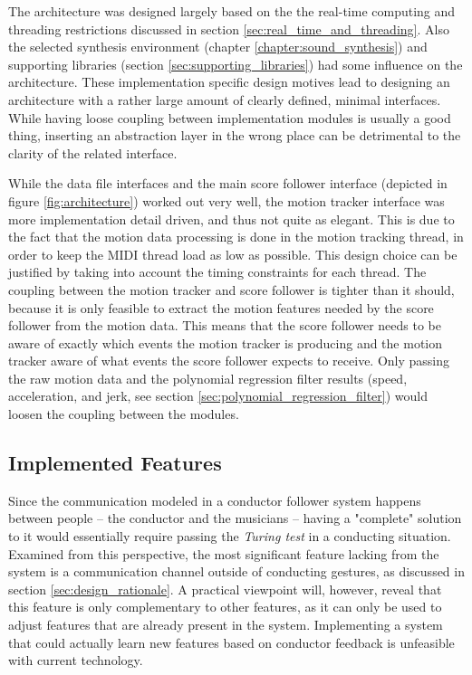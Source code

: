 The architecture was designed largely
based on the the
real-time computing and threading
restrictions discussed
in section \ref{sec:real_time_and_threading}.
Also the selected synthesis environment
(chapter \ref{chapter:sound_synthesis})
and supporting libraries
(section \ref{sec:supporting_libraries})
had some influence on the architecture.
These implementation specific
design motives lead to designing an architecture
with a rather large amount of clearly defined,
minimal interfaces.
While having loose coupling between
implementation modules is
usually a good thing,
inserting an abstraction layer
in the wrong place can be detrimental
to the clarity of the related interface.

While the data file interfaces
and the main score follower interface
(depicted in figure \ref{fig:architecture})
worked out very well,
the motion tracker interface
was more implementation detail driven,
and thus not quite as elegant.
This is due to the fact that the
motion data processing is done
in the motion tracking thread,
in order to keep the MIDI thread load
as low as possible.
This design choice can be justified
by taking into account the
timing constraints for each thread.
The coupling between the motion tracker
and score follower is tighter than it should,
because it is only feasible to extract
the motion features needed by the score follower
from the motion data.
This means that the score follower needs to be
aware of exactly which events the motion tracker is producing
and the motion tracker aware of what events the score follower
expects to receive.
Only passing the raw motion data
and the polynomial regression filter results
(speed, acceleration, and jerk, see section
\ref{sec:polynomial_regression_filter})
would loosen the coupling between the modules.

\subsection{Implemented Features}
\label{sec:implemented_features}

Since the communication modeled in
a conductor follower system
happens between people --
the conductor and the musicians --
having a "complete" solution to it
would essentially require passing
the \textit{Turing test} \cite{Turing1950}
in a conducting situation.
Examined from this perspective,
the most significant feature
lacking from the system
is a communication channel outside
of conducting gestures,
as discussed in section \ref{sec:design_rationale}.
A practical viewpoint will, however,
reveal that this feature is only
complementary to other features,
as it can only be used to adjust
features that are already present in the system.
Implementing a system that could actually
learn new features based on conductor feedback
is unfeasible with current technology.

